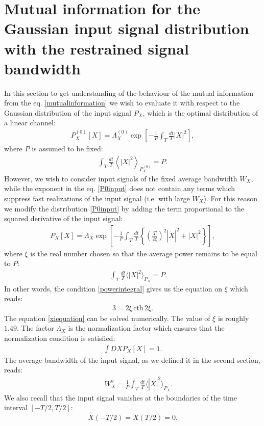 \documentclass{article}
\begin{document}
\section{Mutual information for the Gaussian input signal distribution with the restrained signal bandwidth}
In this section to get understanding of the behaviour of the mutual information from the eq. \eqref{mutualinformation} we wish to evaluate it with respect to the Gaussian distribution of the input signal $P_{X}$, which is the optimal distribution of a linear channel: 
\begin{eqnarray}\label{P0input}
    P_{X}^{(0)}[X] = \Lambda_{X}^{(0)} \exp \left[-\frac{1}{P}\int_{T} \frac{dt}{T} |X|^{2}\right],
\end{eqnarray}
where $P$ is assumed to be fixed:
\begin{eqnarray}
    \int_{T} \frac{dt}{T}\left\langle|X|^{2}\right\rangle_{P_{X}^{(0)}} = P.
\end{eqnarray}
However, we wish to consider input signals of the fixed average bandwidth $W_{X}$, while the exponent in the eq. \eqref{P0input} does not contain any terms which suppress fast realizations of the input signal (i.e. with large $W_{X}$). For this reason we modify the distribution \eqref{P0input} by adding the term proportional to the squared derivative of the input signal:
\begin{eqnarray}\label{PXosc}
    P_{X}[X] = \Lambda_{X} \exp \left[-\frac{1}{P}\int_{T} \frac{dt}{T} \left\{\left(\frac{T}{2\xi} \right)^{2} |\dot{X}|^{2}+|X|^{2}\right\}\right],
\end{eqnarray}
where $\xi$ is the real number chosen so that the average power remains to be equal to $P$:
\begin{eqnarray}\label{powerintegral}
    && \int_{T} \frac{dt}{T} \langle |X|^{2} \rangle_{P_{X}} = P.
\end{eqnarray}
In other words, the condition \eqref{powerintegral} gives us the equation on $\xi$ which reads:
\begin{eqnarray}\label{xiequation}
    3 = 2\xi\, \textrm{cth}\,2\xi.
\end{eqnarray}
The equation \eqref{xiequation} can be solved numerically. The value of $\xi$ is roughly $1.49$. The factor $\Lambda_{X}$ is the normalization factor which ensures that the normalization condition is satisfied: 
\begin{eqnarray}
    \int DX P_{X}[X] = 1.
\end{eqnarray}
The average bandwidth of the input signal, as we defined it in the second section, reads: 
\begin{eqnarray}\label{widthintegral}
    && W_{X}^{2} = \frac{1}{P} \int_{T} \frac{dt}{T} \langle |\dot{X}|^{2} \rangle_{P_{X}}.
\end{eqnarray}
We also recall that the input signal vanishes at the boundaries of the time interval $[-T/2, T/2]$: 
\begin{eqnarray}\label{boundaryconditions}
    X(-T/2) = X(T/2) = 0.
\end{eqnarray}
\end{document}
